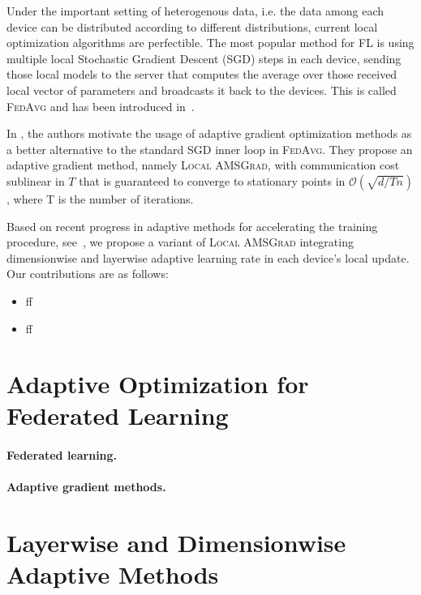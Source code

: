 \documentclass{article}
\begin{document}
Under the important setting of heterogenous data, i.e. the data among each device can be distributed according to different distributions, current local optimization algorithms are perfectible.
The most popular method for FL is using multiple local Stochastic Gradient Descent (\textsc{SGD}) steps in each device, sending those local models to the server that computes the average over those received local vector of parameters and broadcasts it back to the devices. This is called \textsc{FedAvg} and has been introduced in~\citep{mcmahan2017communication}.

In \citep{chen2020toward}, the authors motivate the usage of adaptive gradient optimization methods as a better alternative to the standard \textsc{SGD} inner loop in \textsc{FedAvg}.
They propose an adaptive gradient method, namely \textsc{Local AMSGrad}, with communication cost sublinear in $T$ that is guaranteed to converge to stationary points in $\mathcal{O}(\sqrt{d/Tn})$, where T is the number of iterations.

Based on recent progress in adaptive methods for accelerating the training procedure, see~\citep{you2019large}, we propose a variant of \textsc{Local AMSGrad} integrating dimensionwise and layerwise adaptive learning rate in each device's local update.
Our contributions are as follows:
\begin{itemize}
\item ff
\item ff
\end{itemize}

\section{Adaptive Optimization for Federated Learning}\label{sec:preliminaries}

\paragraph{Federated learning.}


\paragraph{Adaptive gradient methods.}


\section{Layerwise and Dimensionwise Adaptive Methods}\label{sec:main}
\end{document}
